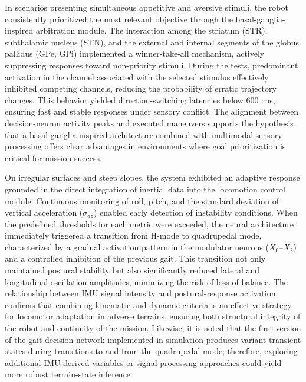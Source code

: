 \documentclass[preprint,12pt]{elsarticle}
\begin{document}
In scenarios presenting simultaneous appetitive and aversive stimuli, the robot consistently prioritized the most relevant objective through the basal-ganglia-inspired arbitration module. The interaction among the striatum (STR), subthalamic nucleus (STN), and the external and internal segments of the globus pallidus (GPe, GPi) implemented a winner-take-all mechanism, actively suppressing responses toward non-priority stimuli. During the tests, predominant activation in the channel associated with the selected stimulus effectively inhibited competing channels, reducing the probability of erratic trajectory changes. This behavior yielded direction-switching latencies below 600~ms, ensuring fast and stable responses under sensory conflict. The alignment between decision-neuron activity peaks and executed maneuvers supports the hypothesis that a basal-ganglia-inspired architecture combined with multimodal sensory processing offers clear advantages in environments where goal prioritization is critical for mission success. 

On irregular surfaces and steep slopes, the system exhibited an adaptive response grounded in the direct integration of inertial data into the locomotion control module. Continuous monitoring of roll, pitch, and the standard deviation of vertical acceleration ($\sigma_{az}$) enabled early detection of instability conditions. When the predefined thresholds for each metric were exceeded, the neural architecture immediately triggered a transition from H-mode to quadrupedal mode, characterized by a gradual activation pattern in the modulator neurons ($X_{0}$–$X_{2}$) and a controlled inhibition of the previous gait. This transition not only maintained postural stability but also significantly reduced lateral and longitudinal oscillation amplitudes, minimizing the risk of loss of balance. The relationship between IMU signal intensity and postural-response activation confirms that combining kinematic and dynamic criteria is an effective strategy for locomotor adaptation in adverse terrains, ensuring both structural integrity of the robot and continuity of the mission. Likewise, it is noted that the first version of the gait-decision network implemented in simulation produces variant transient states during transitions to and from the quadrupedal mode; therefore, exploring additional IMU-derived variables or signal-processing approaches could yield more robust terrain-state inference. 
\end{document}

